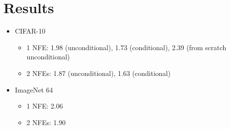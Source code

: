 \documentclass[10pt]{article}
\begin{document}
\section{Results}

\begin{itemize}
    \item CIFAR-10
    \begin{itemize}
      \item 1 NFE: 1.98 (unconditional), 1.73 (conditional), 2.39 (from scratch unconditional)
      \item 2 NFEs: 1.87 (unconditional), 1.63 (conditional)      
    \end{itemize}
    \item ImageNet 64
    \begin{itemize}
      \item 1 NFE: 2.06
      \item 2 NFEs: 1.90
    \end{itemize}
\end{itemize}


  
\end{document}
